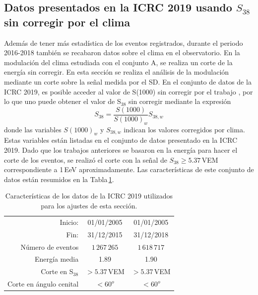 \subsection{Datos presentados en la ICRC 2019 usando $S_{38}$ sin corregir por el clima} \label{sin_corregir_s38}

Además de tener más estadística de los eventos registrados, durante el periodo 2016-2018 también se recabaron datos sobre el clima en el observatorio. En la modulación del clima estudiada con el conjunto A, se  realiza un corte de la energía sin corregir. En esta sección se realiza el análisis de la modulación mediante un  corte sobre la señal medida por el SD. En el conjunto de datos de la ICRC 2019, es posible acceder al valor de S(1000) sin corregir por el trabajo \cite{aab2017impact}, por lo que uno puede obtener el valor de S$_{38}$ sin corregir mediante la expresión
\begin{equation}
S_{38} = \frac{S(1000)}{S(1000)_w}S_{38,w}
\label{eq:s38_w}
\end{equation}
donde las variables $S(1000)_w$ y $S_{38,w}$ indican los valores corregidos por clima. Estas variables están listadas en el conjunto de datos presentado en la ICRC 2019. Dado que los trabajos anteriores se basaron en la energía para hacer el corte de los eventos, se realizó el corte con la señal de $S_{38}\ge 5.37\,$VEM correspondiente a 1\,EeV aproximadamente. Las características de este conjunto de datos están resumidos en la Tabla\,\ref{tabla:caracteristicas_ICRC_2019_S38}.
   \begin{table}[H]
       \centering
       \begin{tabular}{r|c|c}
       Inicio:                 & 01/01/2005                 &  01/01/2005 \\
       Fin:                    & 31/12/2015                 &   31/12/2018 \\
       Número de eventos       &   $1\,267\,265$     	    &  $1\,618\,717$     		\\ 
       Energía media           &  1.89        		 	    &  1.90        		\\  
       Corte en S$_{38}$ 	   &  $>5.37$\,VEM   		 	    &  $>5.37$\,VEM       	\\  
       Corte en ángulo cenital &  $<60^o$ 			 	 & $<60^o$\\ 
       \end{tabular}
       \caption{Características de los datos de la ICRC 2019 utilizados para los ajustes de esta sección.} \label{tabla:caracteristicas_ICRC_2019_S38}
   \end{table}
   
